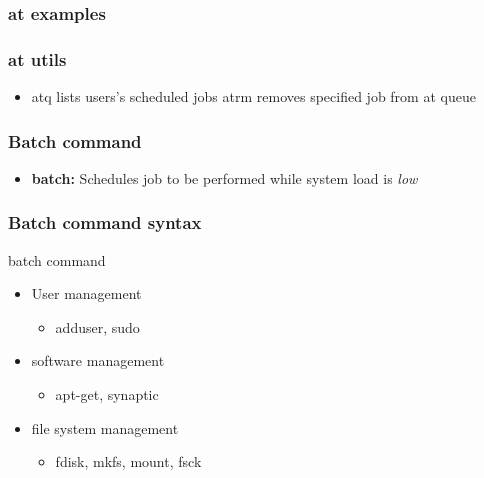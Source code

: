 \documentclass{report}
\begin{document}
    \bigbreak \noindent 
    \subsubsection{at examples}
    \bigbreak \noindent 

    \bigbreak \noindent 
    \subsubsection{at utils}
    \begin{itemize}
        \item atq lists users's scheduled jobs
        \ime atrm removes specified job from at queue
    \end{itemize}

    \bigbreak \noindent 
    \subsubsection{Batch command}
    \begin{itemize}
        \item \textbf{batch:} Schedules job to be performed while system load is \textit{low}
    \end{itemize}
    \bigbreak \noindent 
    \subsubsection{Batch command syntax}
    \bigbreak \noindent 
    \begin{bashcode}
    batch command
    \end{bashcode}



    \pagebreak 
    \begin{itemize}
        \item User management
            \begin{itemize}
                \item adduser, sudo
            \end{itemize}
        \item software management
            \begin{itemize}
                \item apt-get, synaptic
            \end{itemize}
        \item file system management
            \begin{itemize}
                \item fdisk, mkfs, mount, fsck
            \end{itemize}
    \end{itemize}
    \bigbreak \noindent 
\end{document}
